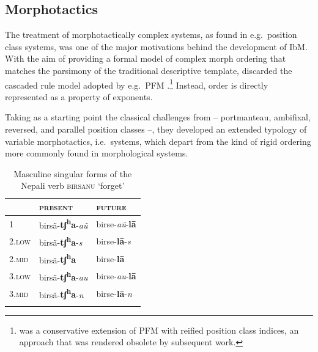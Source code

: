 \documentclass[output=paper
 	        ,biblatex
                ,babelshorthands
                ,newtxmath
                ,draftmode
                ,colorlinks, citecolor=brown
]{langscibook}
\begin{document}
\begin{exe}
\begin{xlist}
\begin{exe}
\begin{xlist}
\subsection{Morphotactics}
\label{sec:Mortax}

The treatment of morphotactically complex systems, as found in e.g.\
position class systems, was one of the major motivations behind the
development of IbM. With the aim of providing a formal model of
complex morph ordering that matches the parsimony of the traditional
descriptive template, \citet{Crysmann:Bonami:2016} discarded the
cascaded rule model adopted by e.g.\ PFM
\citep{Stump01}.\footnote{\citet{Crysmann12} was a conservative
  extension of PFM with reified position class indices, an approach
  that was rendered obsolete by subsequent work.} Instead, order is
directly represented as a property of exponents.

Taking as a starting point the classical challenges from
\citet{Stump93} -- portmanteau, ambifixal, reversed, and parallel
position classes --, they developed an extended typology of variable
morphotactics, i.e.\ systems, which depart from the kind of rigid
ordering more commonly found in morphological systems.

\begin{table}[ht!]
\centering
    \begin{tabular}{lll}
      \lsptoprule
      & \textsc{present} & \textsc{future}\\
      \midrule
      1 & birsã-\textbf{tʃ\textsuperscript{h}a}-\emph{aũ} & 
                                                                birse-\emph{aũ}-\textbf{lā}\\
      \textsc{2.low} &
                 birsã-\textbf{tʃ\textsuperscript{h}a}-\emph{s} & 
                                                                      birse-\textbf{lā}-\emph{s}\\
      \textsc{2.mid} & 
                  birsã-\textbf{tʃ\textsuperscript{h}a} & 
                                                         birse-\textbf{lā}\\
      \textsc{3.low} & 
                  birsã-\textbf{tʃ\textsuperscript{h}a}-\emph{au} & 
                                                                        birse-\emph{au}-\textbf{lā}\\
      \textsc{3.mid} &
                 birsã-\textbf{tʃ\textsuperscript{h}a}-\emph{n} & 
                                                                      birse-\textbf{lā}-\emph{n}\\
      \lspbottomrule
    \end{tabular}
\caption{Masculine singular forms of the Nepali verb \textsc{birsanu} ‘forget’}
\label{tab:Nepali}
\end{table}


\end{xlist}
\end{exe}
\end{xlist}
\end{exe}
\end{document}
